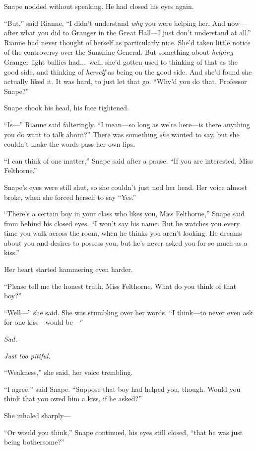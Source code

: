 Snape nodded without speaking. He had closed his eyes again.

“But,” said Rianne, “I didn’t understand \emph{why} you were helping her. And now—after what you did to Granger in the Great Hall—I just don’t understand at all.” Rianne had never thought of herself as particularly nice. She’d taken little notice of the controversy over the Sunshine General. But something about \emph{helping} Granger fight bullies had...\ well, she’d gotten used to thinking of that as the good side, and thinking of \emph{herself} as being on the good side. And she’d found she actually liked it. It was hard, to just let that go. “Why’d you do that, Professor Snape?”

Snape shook his head, his face tightened.

“Is—” Rianne said falteringly. “I mean—so long as we’re here—is there anything you do want to talk about?” There was something \emph{she} wanted to say, but she couldn’t make the words pass her own lips.

“I can think of one matter,” Snape said after a pause. “If you are interested, Miss Felthorne.”

Snape’s eyes were still shut, so she couldn’t just nod her head. Her voice almost broke, when she forced herself to say “Yes.”

“There’s a certain boy in your class who likes you, Miss Felthorne,” Snape said from behind his closed eyes. “I won’t say his name. But he watches you every time you walk across the room, when he thinks you aren’t looking. He dreams about you and desires to possess you, but he’s never asked you for so much as a kiss.”

Her heart started hammering even harder.

“Please tell me the honest truth, Miss Felthorne. What do you think of that boy?”

“Well—” she said. She was stumbling over her words. “I think—to never even ask for one kiss—would be—”

\emph{Sad.}

\emph{Just too p}\emph{itiful.}

“Weakness,” she said, her voice trembling.

“I agree,” said Snape. “Suppose that boy had helped you, though. Would you think that you owed him a kiss, if he asked?”

She inhaled sharply—

“Or would you think,” Snape continued, his eyes still closed, “that he was just being bothersome?”

